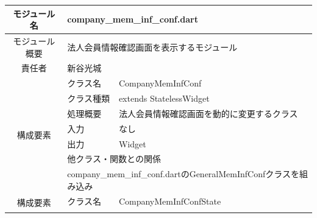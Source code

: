 \begin{table}[H]
  \centering
  \begin{tabular}{|c|l|l|} \hline
    モジュール名                & \multicolumn{2}{l|}{company\_mem\_inf\_conf.dart}                                                                                    \\ \hline
    モジュール概要               & \multicolumn{2}{p{12cm}|}{法人会員情報確認画面を表示するモジュール}                                                                                      \\ \hline
    責任者                   & \multicolumn{2}{l|}{新谷光城}                                                                                                            \\ \hline
    \multirow{7}{*}{構成要素} & クラス名                                                                              & CompanyMemInfConf                                \\ \cline{2-3}
                          & クラス種類                                                                             & extends StatelessWidget                          \\ \cline{2-3}
                          & 処理概要                                                                              & \multicolumn{1}{p{12cm}|}{法人会員情報確認画面を動的に変更するクラス} \\ \cline{2-3}
                          & 入力                                                                                & なし                                               \\ \cline{2-3}
                          & 出力                                                                                & Widget                                           \\ \cline{2-3}
                          & \multicolumn{2}{l|}{他クラス・関数との関係}                                                                                                     \\ \cline{2-3}
                          & \multicolumn{2}{p{14cm}|}{company\_mem\_inf\_conf.dartのGeneralMemInfConfクラスを組み込み}                                                    \\ \hline
    \multirow{7}{*}{構成要素} & クラス名                                                                              & CompanyMemInfConfState                           \\ \cline{2-3}

\end{tabular}
\end{table}

